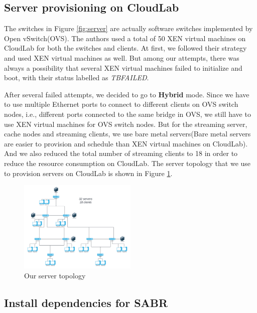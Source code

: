 \documentclass{article}
\begin{document}
\subsection{Server provisioning on CloudLab}

The switches in Figure \ref{fig:server} are actually software switches implemented by Open vSwitch(OVS). The authors used a total of 50 XEN virtual machines on CloudLab for both the switches and clients. At first, we followed their strategy and used XEN virtual machines as well. But among our attempts, there was always a possibility that several XEN virtual machines failed to initialize and boot, with their status labelled as \textit{TBFAILED}. 


After several failed attempts, we decided to go to \textbf{Hybrid} mode. Since we have to use multiple Ethernet ports to connect to different clients on OVS switch nodes, i.e., different ports connected to the same bridge in OVS, we still have to use XEN virtual machines for OVS switch nodes. But for the streaming server, cache nodes and streaming clients, we use bare metal servers(Bare metal servers are easier to provision and schedule than XEN virtual machines on CloudLab). And we also reduced the total number of streaming clients to 18 in order to reduce the resource consumption on CloudLab. The server topology that we use to provision servers on CloudLab is shown in Figure \ref{fig:our-topology}. 

\begin{figure}
\centering
\includegraphics[width=0.5\textwidth]{images/SBAR Simple.png}
\caption{Our server topology}
\label{fig:our-topology}
\end{figure}

\subsection{Install dependencies for SABR}
\end{document}
